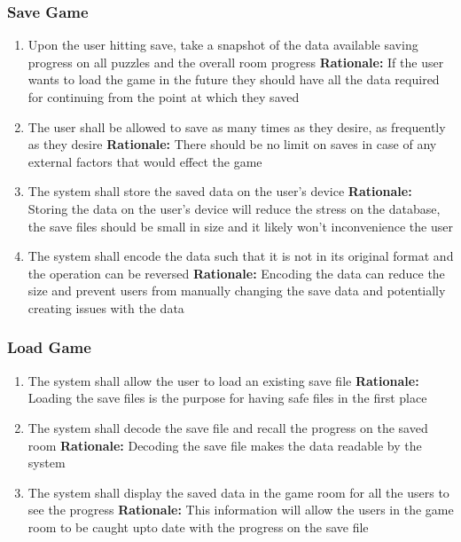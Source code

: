 \documentclass[12pt]{article}
\begin{document}
\subsubsection{Save Game}
\begin{enumerate}[label=SG\arabic*., series=SaveGame]
    \item Upon the user hitting save, take a snapshot of the data available saving progress on all puzzles and the overall room progress \newline 
    \textbf{Rationale:} If the user wants to load the game in the future they should have all the data required for continuing from the point at which they saved
    \item The user shall be allowed to save as many times as they desire, as frequently as they desire \newline 
    \textbf{Rationale:} There should be no limit on saves in case of any external factors that would effect the game
    \item The system shall store the saved data on the user's device \newline 
    \textbf{Rationale:} Storing the data on the user's device will reduce the stress on the database, the save files should be small in size and it likely won't inconvenience the user
    \item The system shall encode the data such that it is not in its original format and the operation can be reversed \newline 
    \textbf{Rationale:} Encoding the data can reduce the size and prevent users from manually changing the save data and potentially creating issues with the data 
\end{enumerate}

\subsubsection{Load Game}
\begin{enumerate}[label=LG\arabic*., series=LoadGame]
	\item The system shall allow the user to load an existing save file \newline 
    \textbf{Rationale:} Loading the save files is the purpose for having safe files in the first place
    \item The system shall decode the save file and recall the progress on the saved room\newline 
    \textbf{Rationale:} Decoding the save file makes the data readable by the system
    \item The system shall display the saved data in the game room for all the users to see the progress\newline 
    \textbf{Rationale:} This information will allow the users in the game room to be caught upto date with the progress on the save file
\end{enumerate}
\end{document}
